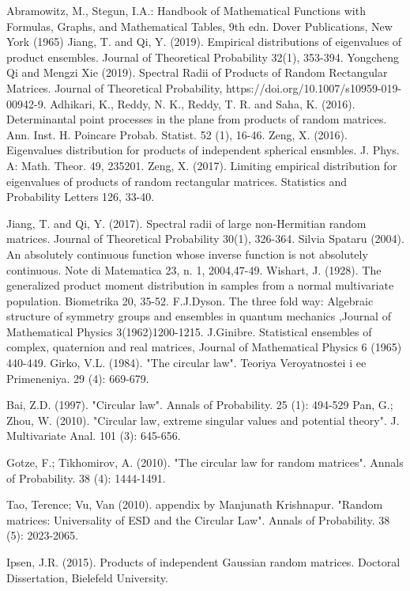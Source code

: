 \documentclass[12pt]{article}
\theoremstyle{plain}
\theoremstyle{definition}
\theoremstyle{remark}
\begin{document}

\begin{thebibliography}{n} %


  Abramowitz, M., Stegun, I.A.: Handbook of Mathematical Functions with Formulas, Graphs, and Mathematical Tables, 9th edn. Dover Publications, New York (1965)
 Jiang, T. and Qi, Y. (2019). Empirical distributions of eigenvalues of product ensembles. Journal of Theoretical Probability 32(1), 353-394.
 Yongcheng Qi and Mengzi Xie (2019). Spectral Radii of Products of Random Rectangular Matrices. Journal of Theoretical Probability, https://doi.org/10.1007/s10959-019-00942-9.
Adhikari, K., Reddy, N. K., Reddy, T. R. and Saha, K. (2016). Determinantal point processes in the plane from products of random matrices. Ann. Inst. H. Poincare Probab. Statist. 52 (1), 16-46.
Zeng, X. (2016). Eigenvalues distribution for products of independent spherical ensmbles. J. Phys. A: Math. Theor. 49, 235201.
Zeng, X. (2017). Limiting empirical distribution for eigenvalues of products of random rectangular matrices. Statistics and Probability Letters 126, 33-40.

Jiang, T. and Qi, Y. (2017). Spectral radii of large non-Hermitian random matrices. Journal of Theoretical Probability 30(1), 326-364.
Silvia Spataru (2004). An absolutely continuous function whose inverse function is not absolutely continuous. Note di Matematica 23, n. 1, 2004,47-49.
  Wishart, J. (1928). The generalized product moment distribution in samples from a normal multivariate population. Biometrika 20, 35-52.
F.J.Dyson. The three fold way: Algebraic structure of symmetry groups and ensembles in quantum mechanics ,Journal of Mathematical Physics 3(1962)1200-1215.
  J.Ginibre. Statistical ensembles of complex, quaternion and real matrices, Journal of Mathematical Physics 6 (1965) 440-449.
 Girko, V.L. (1984). "The circular law". Teoriya Veroyatnostei i ee Primeneniya. 29 (4): 669-679.

Bai, Z.D. (1997). "Circular law". Annals of Probability. 25 (1): 494-529
Pan, G.; Zhou, W. (2010). "Circular law, extreme singular values and potential theory". J. Multivariate Anal. 101 (3): 645-656.

Gotze, F.; Tikhomirov, A. (2010). "The circular law for random matrices". Annals of Probability. 38 (4): 1444-1491.

 Tao, Terence; Vu, Van (2010). appendix by Manjunath Krishnapur. "Random matrices: Universality of ESD and the Circular Law". Annals of Probability. 38 (5): 2023-2065.
 
 Ipsen, J.R. (2015). Products of independent Gaussian random matrices. Doctoral Dissertation, Bielefeld University.
\end{thebibliography}
\end{document}
